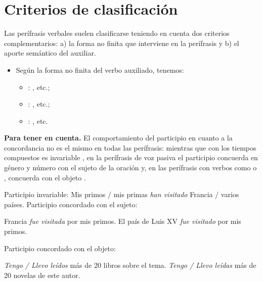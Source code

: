 \section{Criterios de clasificación}\label{sec:11-clasificacion}

Las perífrasis verbales suelen clasificarse teniendo en cuenta dos criterios
complementarios: a) la forma no finita que interviene en la perífrasis y b) el
aporte semántico del auxiliar.

\begin{itemize}
  \item Según la forma no finita del verbo auxiliado,
        tenemos:
        \begin{itemize}
          \item {}: , etc.;
          \item {}: , etc.;
          \item {}: , etc.
        \end{itemize}
\end{itemize}

\begin{destacado}
\textbf{Para tener en cuenta.} El comportamiento del participio en cuanto a la
concordancia no es el mismo en todas las perífrasis: mientras que con los tiempos
compuestos es invariable , en la perífrasis de voz pasiva el
participio concuerda en género y número con el sujeto de la oración
 y, en las perífrasis con verbos como  o
, concuerda con el objeto .

\begin{exe}
  \ex\label{ex:11-primos} Participio invariable: Mis primos / mis primas
      \textit{han visitado} Francia / varios países.
  \ex\label{ex:11-francia} Participio concordado con el sujeto:
    \begin{xlist}
      \ex Francia \textit{fue visitada} por mis primos.
      \ex El país de Luis XV \textit{fue visitado} por mis primos.
    \end{xlist}
  \ex\label{ex:11-libros} Participio concordado con el objeto:
    \begin{xlist}
      \ex \textit{Tengo / Llevo leídos} más de 20 libros sobre el tema.
      \ex \textit{Tengo / Llevo leídas} más de 20 novelas de este autor.
    \end{xlist}
\end{exe}
\end{destacado}

